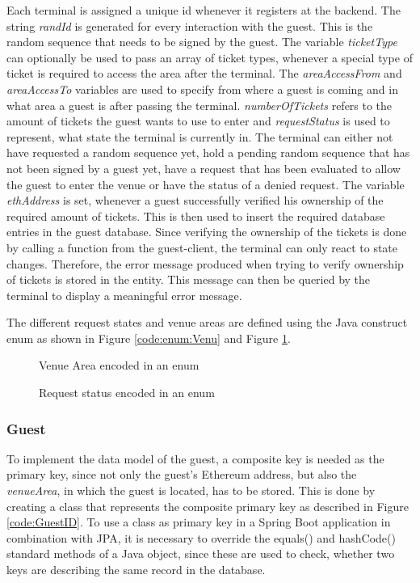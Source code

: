 Each terminal is assigned a unique id whenever it registers at the backend. The string \textit{randId} is generated for every interaction with the guest. This is the random sequence that needs to be signed by the guest. The variable \textit{ticketType} can optionally be used to pass an array of ticket types, whenever a special type of ticket is required to access the area after the terminal. The \textit{areaAccessFrom} and \textit{areaAccessTo} variables are used to specify from where a guest is coming and in what area a guest is after passing the terminal. \textit{numberOfTickets} refers to the amount of tickets the guest wants to use to enter and \textit{requestStatus} is used to represent, what state the terminal is currently in. The terminal can either not have requested a random sequence yet, hold a pending random sequence that has not been signed by a guest yet, have a request that has been evaluated to allow the guest to enter the venue or have the status of a denied request.
The variable \textit{ethAddress} is set, whenever a guest successfully verified his ownership of the required amount of tickets. This is then used to insert the required database entries in the guest database. Since verifying the ownership of the tickets is done by calling a function from the guest-client, the terminal can only react to state changes. Therefore, the error message produced when trying to verify ownership of tickets is stored in the entity. This message can then be queried by the terminal to display a meaningful error message. 

The different request states and venue areas are defined using the Java construct enum as shown in Figure \ref{code:enum:Venu} and Figure \ref{code:enum:Req}.

\begin{figure}[H]
    
    \caption{Venue Area encoded in an enum}
    \label{code:enum:Venu}
    
    \caption{Request status encoded in an enum}
    \label{code:enum:Req}
\end{figure}

\subsubsection{Guest}
To implement the data model of the guest, a composite key is needed as the primary key, since not only the guest's Ethereum address, but also the \textit{venueArea}, in which the guest is located, has to be stored. This is done by creating a class that represents the composite primary key as described in Figure \ref{code:GuestID}. To use a class as primary key in a Spring Boot application in combination with JPA, it is necessary to override the equals() and hashCode() standard methods of a Java object, since these are used to check, whether two keys are describing the same record in the database.

